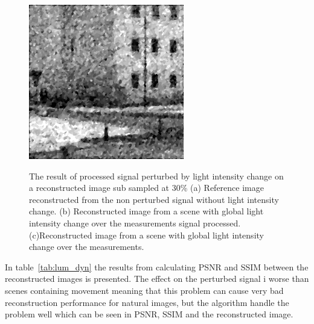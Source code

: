 \begin{figure}[H]
\begin{minipage}[t]{0.32\textwidth}
    \subcaption{}
    \label{fig:lum_4}
\end{minipage}
\begin{minipage}[t]{0.32\textwidth}
    \includegraphics[width = \textwidth]{result/dynamic/lum/intense_change_psnr_19_snr_14_sssim_38.png}
    \subcaption{}
    \label{fig:lum_32}
\end{minipage}
    \caption{The result of processed signal perturbed by light intensity change on a reconstructed image sub sampled at 30\% (a) Reference image reconstructed from the non perturbed signal without light intensity change. (b) Reconstructed image from a scene with global light intensity change over the measurements signal processed. (c)Reconstructed image from a scene with global light intensity change over the measurements.}
    \label{fig:lum_rec}
\end{figure}

In table~\ref{tab:lum_dyn} the results from calculating PSNR and SSIM between the reconstructed images is presented. The effect on the perturbed signal i worse than scenes containing movement meaning that this problem can cause very bad reconstruction performance for natural images, but the algorithm handle the problem well which can be seen in PSNR, SSIM and the reconstructed image.  


